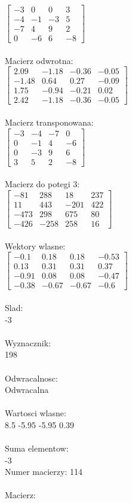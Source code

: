 \documentclass[a4paper,12pt]{article}
\begin{document}
$\begin{bmatrix} -3&0&0&3\\-4&-1&-3&5\\-7&4&9&2\\0&-6&6&-8 \end{bmatrix}$
\\
\\
Macierz odwrotna:\\

$\begin{bmatrix} 2.09&-1.18&-0.36&-0.05\\-1.48&0.64&0.27&-0.09\\1.75&-0.94&-0.21&0.02\\2.42&-1.18&-0.36&-0.05 \end{bmatrix}$
\\
\\
Macierz transponowana:\\

$\begin{bmatrix} -3&-4&-7&0\\0&-1&4&-6\\0&-3&9&6\\3&5&2&-8 \end{bmatrix}$
\\
\\
Macierz do potegi 3:\\

$\begin{bmatrix} -81&288&18&237\\11&443&-201&422\\-473&298&675&80\\-426&-258&258&16 \end{bmatrix}$
\\
\\
Wektory wlasne:\\

$\begin{bmatrix} -0.1&0.18&0.18&-0.53\\0.13&0.31&0.31&0.37\\-0.91&0.08&0.08&-0.47\\-0.38&-0.67&-0.67&-0.6 \end{bmatrix}$
\\
\\
Slad:\\
-3
\\
\\
Wyznacznik:\\
198
\\
\\
Odwracalnosc:\\
Odwracalna
\\
\\
Wartosci wlasne:\\
8.5 -5.95 -5.95 0.39
\\
\\
Suma elementow:\\
-3
\\
\newpage
Numer macierzy:
114
\\
\\
Macierz:\\
\end{document}
